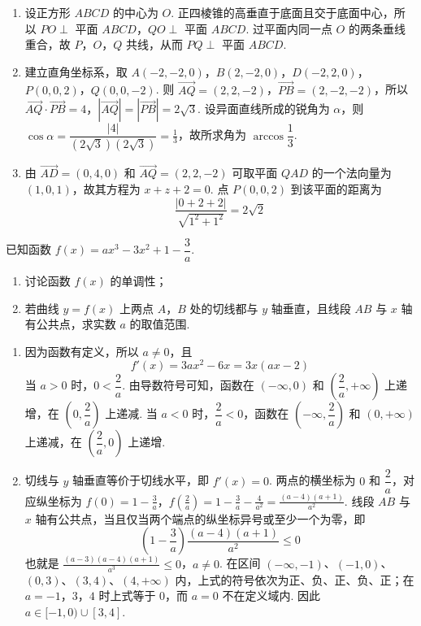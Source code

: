 \begin{solution}
\begin{enumerate}
\item 设正方形 \(ABCD\) 的中心为 \(O\). 正四棱锥的高垂直于底面且交于底面中心，所以 \(PO\perp\) 平面 \(ABCD\)，\(QO\perp\) 平面 \(ABCD\). 过平面内同一点 \(O\) 的两条垂线重合，故 \(P\)，\(O\)，\(Q\) 共线，从而 \(PQ\perp\) 平面 \(ABCD\).
\item 建立直角坐标系，取
\(A(-2,-2,0)\)，\(B(2,-2,0)\)，\(D(-2,2,0)\)，\(P(0,0,2)\)，\(Q(0,0,-2)\).
则 \(\overrightarrow{AQ}=(2,2,-2)\)，\(\overrightarrow{PB}=(2,-2,-2)\)，所以
\(\overrightarrow{AQ}\cdot\overrightarrow{PB}=4\)，\(|\overrightarrow{AQ}|=|\overrightarrow{PB}|=2\sqrt{3}\).
设异面直线所成的锐角为 \(\alpha\)，则 \(\cos\alpha=\dfrac{|4|}{(2\sqrt{3})(2\sqrt{3})}=\frac13\)，故所求角为 \(\arccos\dfrac13\).
\item 由 \(\overrightarrow{AD}=(0,4,0)\) 和 \(\overrightarrow{AQ}=(2,2,-2)\) 可取平面 \(QAD\) 的一个法向量为 \((1,0,1)\)，故其方程为 \(x+z+2=0\). 点 \(P(0,0,2)\) 到该平面的距离为
\[
\frac{|0+2+2|}{\sqrt{1^2+1^2}}=2\sqrt{2}
\]
\end{enumerate}
\end{solution}

\begin{problem}
已知函数 \(f(x)=ax^3-3x^2+1-\dfrac{3}{a}\).

\begin{enumerate}
\item 讨论函数 \(f(x)\) 的单调性；
\item 若曲线 \(y=f(x)\) 上两点 \(A\)，\(B\) 处的切线都与 \(y\) 轴垂直，且线段 \(AB\) 与 \(x\) 轴有公共点，求实数 \(a\) 的取值范围.
\end{enumerate}
\end{problem}

\begin{solution}
\begin{enumerate}
\item 因为函数有定义，所以 \(a\neq0\)，且
\[
f'(x)=3ax^2-6x=3x(ax-2)
\]
当 \(a>0\) 时，\(0<\dfrac{2}{a}\). 由导数符号可知，函数在 \((-\infty,0)\) 和 \(\left(\dfrac{2}{a},+\infty\right)\) 上递增，在 \(\left(0,\dfrac{2}{a}\right)\) 上递减. 当 \(a<0\) 时，\(\dfrac{2}{a}<0\)，函数在 \(\left(-\infty,\dfrac{2}{a}\right)\) 和 \((0,+\infty)\) 上递减，在 \(\left(\dfrac{2}{a},0\right)\) 上递增.
\item 切线与 \(y\) 轴垂直等价于切线水平，即 \(f'(x)=0\). 两点的横坐标为 \(0\) 和 \(\dfrac{2}{a}\)，对应纵坐标为
\(f(0)=1-\frac{3}{a}\)，\(f\left(\frac{2}{a}\right)=1-\frac{3}{a}-\frac{4}{a^2}=\frac{(a-4)(a+1)}{a^2}\).
线段 \(AB\) 与 \(x\) 轴有公共点，当且仅当两个端点的纵坐标异号或至少一个为零，即
\[
\left(1-\frac{3}{a}\right)\frac{(a-4)(a+1)}{a^2}\leqslant0
\]
也就是
\(\frac{(a-3)(a-4)(a+1)}{a^3}\leqslant0\)，\(a\neq0\).
在区间 \((-\infty,-1)\)、\((-1,0)\)、\((0,3)\)、\((3,4)\)、\((4,+\infty)\) 内，上式的符号依次为正、负、正、负、正；在 \(a=-1\)，\(3\)，\(4\) 时上式等于 \(0\)，而 \(a=0\) 不在定义域内. 因此 \(a\in[-1,0)\cup[3,4]\).
\end{enumerate}
\end{solution}

